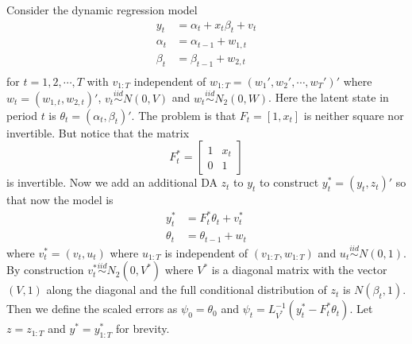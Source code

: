 \documentclass{article}
\begin{document}
Consider the dynamic regression model
\begin{align*}
y_t & = \alpha_t + x_t\beta_t + v_t\\
\alpha_t & = \alpha_{t-1} + w_{1,t}\\
\beta_t & = \beta_{t-1} + w_{2,t}\\
\end{align*}
for $t=1,2,\cdots,T$ with $v_{1:T}$ independent of $w_{1:T}=(w_1',w_2',\cdots,w_T')'$ where $w_t=(w_{1,t},w_{2,t})'$, $v_t\stackrel{iid}{\sim} N(0,V)$ and $w_t \stackrel{iid}{\sim}N_2(0,W)$.  Here the latent state in period $t$ is $\theta_t=(\alpha_t,\beta_t)'$. The problem is that $F_t=[1,x_t]$ is neither square nor invertible. But notice that the matrix
\[
F^*_t = \begin{bmatrix} 1 & x_t \\ 0 & 1 \end{bmatrix}
\]
is invertible. Now we add an additional DA $z_t$ to $y_t$ to construct $y_t^* = (y_t, z_t)'$ so that now the model is
\begin{align*}
y_t^* &= F_t^*\theta_t + v_t^*\\
\theta_t& = \theta_{t-1} + w_t
\end{align*}
where $v_t^* = (v_t, u_t)$ where $u_{1:T}$ is independent of $(v_{1:T}, w_{1:T})$ and $u_t\stackrel{iid}{\sim} N(0,1)$. By construction $v_t^*\stackrel{iid}{\sim} N_2(0,V^*)$ where $V^*$ is a diagonal matrix with the vector $(V,1)$ along the diagonal and the full conditional distribution of $z_t$ is $N(\beta_t,1)$. Then we define the scaled errors as $\psi_0 = \theta_0$ and $\psi_t=L_{V^*}^{-1}(y_t^* - F_t^*\theta_t)$. Let $z=z_{1:T}$ and $y^*=y^*_{1:T}$ for brevity. 
\end{document}
